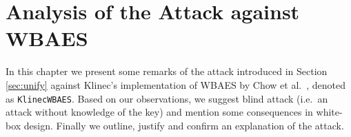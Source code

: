 \chapter{Analysis of the Attack against WBAES}
\label{chap:analysis}

In this chapter we present some remarks of the attack introduced in Section \ref{sec:unify} against Klinec's implementation \cite{klinec2013implementation} of WBAES by Chow et al.\ \cite{chow2002aes}, denoted as {\tt KlinecWBAES}. Based on our observations, we suggest blind attack (i.e.\ an attack without knowledge of the key) and mention some consequences in white-box design. %
Finally we outline, justify and confirm an explanation of the attack.








